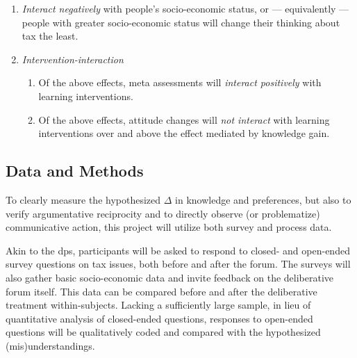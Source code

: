 \begin{enumerate}
\begin{enumerate}
		\item \label{itm:interact-ses}
		\emph{Interact negatively} with people's socio-economic status, or --- equivalently --- people with greater socio-economic status will change their thinking about tax the least.
		\item \label{itm:interventions}
		\emph{Intervention-interaction}
		\begin{enumerate}
			\item Of the above effects, meta assessments will \emph{interact positively} with learning interventions.
			\item Of the above effects, attitude changes will \emph{not interact} with learning interventions over and above the effect mediated by knowledge gain.
		\end{enumerate}
	\end{enumerate}
\end{enumerate}


\subsection{Data and Methods}
To clearly measure the hypothesized $\Delta$ in knowledge and preferences, but also to verify argumentative reciprocity and to directly observe (or problematize) communicative action, this project will utilize both survey and process data.

Akin to the \gls{dp}s, participants will be asked to respond to closed- and open-ended survey questions on tax issues, both before and after the forum.
The surveys will also gather basic socio-economic data and invite feedback on the deliberative forum itself.
This data can be compared before and after the deliberative treatment within-subjects.
Lacking a sufficiently large sample, in lieu of quantitative analysis of closed-ended questions, responses to open-ended questions will be qualitatively coded and compared with the hypothesized (mis)understandings.

